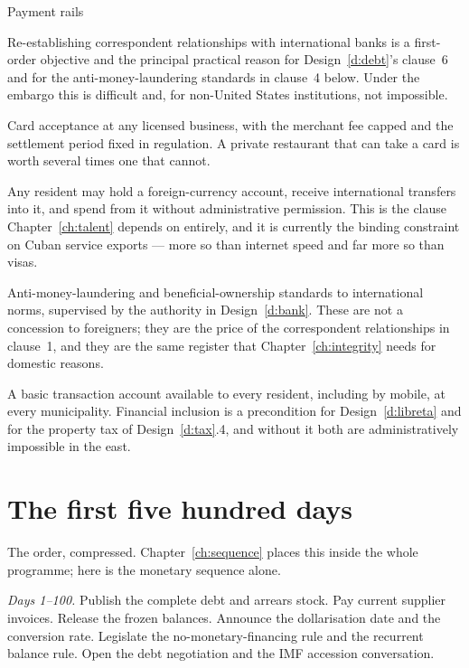 \begin{design}{Payment rails}
\label{d:pay2}
\begin{rules}
 Re-establishing correspondent relationships with
international banks is a first-order objective and the principal practical
reason for Design~\ref{d:debt}'s clause~6 and for the anti-money-laundering
standards in clause~4 below. Under the embargo this is difficult and, for
non-United States institutions, not impossible.

 Card acceptance at any licensed business, with the
merchant fee capped and the settlement period fixed in regulation. A private
restaurant that can take a card is worth several times one that cannot.

 Any resident may hold a foreign-currency
account, receive international transfers into it, and spend from it without
administrative permission. This is the clause Chapter~\ref{ch:talent} depends on
entirely, and it is currently the binding constraint on Cuban service exports ---
more so than internet speed and far more so than visas.

 Anti-money-laundering and beneficial-ownership standards to
international norms, supervised by the authority in Design~\ref{d:bank}. These
are not a concession to foreigners; they are the price of the correspondent
relationships in clause~1, and they are the same register that
Chapter~\ref{ch:integrity} needs for domestic reasons.

 A basic transaction account available to every resident, including
by mobile, at every municipality. Financial inclusion is a precondition for
Design~\ref{d:libreta} and for the property tax of Design~\ref{d:tax}.4, and
without it both are administratively impossible in the east.
\end{rules}
\end{design}

\section{The first five hundred days}

The order, compressed. Chapter~\ref{ch:sequence} places this inside the whole
programme; here is the monetary sequence alone.

\emph{Days 1--100.} Publish the complete debt and arrears stock. Pay current
supplier invoices. Release the frozen balances. Announce the dollarisation date
and the conversion rate. Legislate the no-monetary-financing rule and the
recurrent balance rule. Open the debt negotiation and the IMF accession
conversation.

